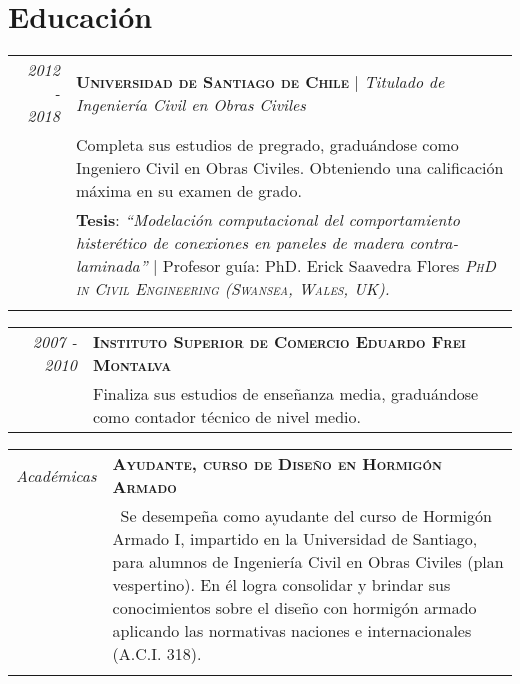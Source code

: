 \documentclass[latterpaper]{article}
\begin{document}


\section{Educación}
	
\begin{tabular}{r p{14 cm}}	
\emph{2012 - 2018} & \textbf{\textsc{Universidad de Santiago de Chile}} | \emph{Titulado de Ingeniería Civil en Obras Civiles} \\

&Completa sus estudios de pregrado, graduándose como Ingeniero Civil en Obras Civiles. Obteniendo una calificación máxima en su examen de grado.\\
&\textbf{Tesis}: \emph{``Modelación computacional del comportamiento histerético de conexiones en paneles de madera contra-laminada''} | Profesor guía: PhD. Erick Saavedra Flores \textsc{\textit{PhD in Civil Engineering (Swansea, Wales, UK).}}\\\multicolumn{2}{c}{}
\end{tabular}
	
\begin{tabular}{r p{}}	
\emph{2007 - 2010} & \textbf{\textsc{Instituto Superior de Comercio Eduardo Frei Montalva}}\\
& Finaliza sus estudios de enseñanza media, graduándose como contador técnico de nivel medio.

\end{tabular}

\begin{tabular}{r p{}}	
\emph{Académicas} & \textbf{\textsc{Ayudante, curso de Diseño en Hormigón Armado}}\\  
&~Se desempeña como ayudante del curso de Hormigón Armado I, impartido en la Universidad de Santiago, para alumnos de Ingeniería Civil en Obras Civiles (plan vespertino). En él logra consolidar y brindar sus conocimientos sobre el diseño con hormigón armado aplicando las normativas naciones e internacionales (A.C.I. 318).\\\\
\end{tabular}
\end{document}

